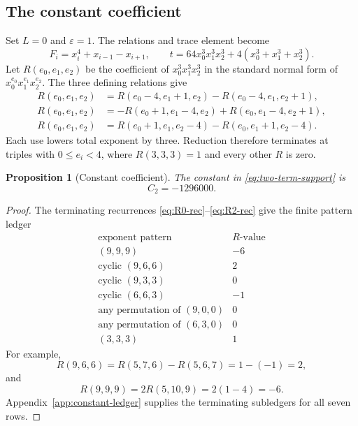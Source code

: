 \documentclass[11pt]{article}
\newtheorem{proposition}[theorem]{Proposition}
\theoremstyle{definition}
\begin{document}
{\subsection{The constant coefficient}

Set $L=0$ and $\varepsilon=1$. The relations and trace element become
\begin{equation}
F_i=x_i^4+x_{i-1}-x_{i+1},
\qquad
t=64x_0^3x_1^3x_2^3+4(x_0^3+x_1^3+x_2^3).
\label{eq:L0-relations}
\end{equation}
Let $R(e_0,e_1,e_2)$ be the coefficient of $x_0^3x_1^3x_2^3$ in the standard normal form of $x_0^{e_0}x_1^{e_1}x_2^{e_2}$. The three defining relations give
\begin{align}
R(e_0,e_1,e_2)
&=R(e_0-4,e_1+1,e_2)-R(e_0-4,e_1,e_2+1),
\label{eq:R0-rec}\\
R(e_0,e_1,e_2)
&=-R(e_0+1,e_1-4,e_2)+R(e_0,e_1-4,e_2+1),
\label{eq:R1-rec}\\
R(e_0,e_1,e_2)
&=R(e_0+1,e_1,e_2-4)-R(e_0,e_1+1,e_2-4).
\label{eq:R2-rec}
\end{align}
Each use lowers total exponent by three. Reduction therefore terminates at triples with $0\le e_i<4$, where $R(3,3,3)=1$ and every other $R$ is zero.

\begin{proposition}[Constant coefficient]
\label{prop:constant}
The constant in \eqref{eq:two-term-support} is
\[
C_2=-1296000.
\]
\end{proposition}

\begin{proof}
The terminating recurrences \eqref{eq:R0-rec}--\eqref{eq:R2-rec} give the finite pattern ledger
\begin{equation}
\begin{array}{c|r}
\text{exponent pattern}&R\text{-value}\\ \hline
(9,9,9)&-6\\
\text{cyclic }(9,6,6)&2\\
\text{cyclic }(9,3,3)&0\\
\text{cyclic }(6,6,3)&-1\\
\text{any permutation of }(9,0,0)&0\\
\text{any permutation of }(6,3,0)&0\\
(3,3,3)&1
\end{array}
\label{eq:R-patterns}
\end{equation}
For example,
\[
R(9,6,6)=R(5,7,6)-R(5,6,7)=1-(-1)=2,
\]
and
\[
R(9,9,9)=2R(5,10,9)=2(1-4)=-6.
\]
Appendix~\ref{app:constant-ledger} supplies the terminating subledgers for all seven rows.


\end{proof}}
\end{document}
